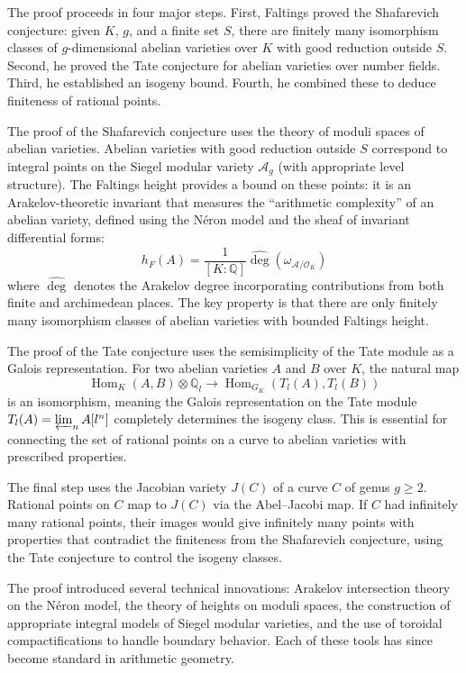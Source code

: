 The proof proceeds in four major steps. First, Faltings proved the Shafarevich conjecture: given $K$, $g$, and a finite set $S$, there are finitely many isomorphism classes of $g$-dimensional abelian varieties over $K$ with good reduction outside $S$. Second, he proved the Tate conjecture for abelian varieties over number fields. Third, he established an isogeny bound. Fourth, he combined these to deduce finiteness of rational points.

The proof of the Shafarevich conjecture uses the theory of moduli spaces of abelian varieties. Abelian varieties with good reduction outside $S$ correspond to integral points on the Siegel modular variety $\mathcal{A}_{g}$ (with appropriate level structure). The Faltings height provides a bound on these points: it is an Arakelov-theoretic invariant that measures the ``arithmetic complexity'' of an abelian variety, defined using the N\'eron model and the sheaf of invariant differential forms:
\[
h_F(A) = \frac{1}{[K:\mathbb{Q}]} \widehat{\deg}(\omega_{\mathcal{A}/\mathcal{O}_K})
\]
where $\widehat{\deg}$ denotes the Arakelov degree incorporating contributions from both finite and archimedean places. The key property is that there are only finitely many isomorphism classes of abelian varieties with bounded Faltings height.

The proof of the Tate conjecture uses the semisimplicity of the Tate module as a Galois representation. For two abelian varieties $A$ and $B$ over $K$, the natural map
\[
\operatorname{Hom}_K(A, B) \otimes \mathbb{Q}_l \to \operatorname{Hom}_{G_K}(T_l(A), T_l(B))
\]
is an isomorphism, meaning the Galois representation on the Tate module $T_l(A) = \varprojlim_n A[l^n]$ completely determines the isogeny class. This is essential for connecting the set of rational points on a curve to abelian varieties with prescribed properties.

The final step uses the Jacobian variety $J(C)$ of a curve $C$ of genus $g \geq 2$. Rational points on $C$ map to $J(C)$ via the Abel--Jacobi map. If $C$ had infinitely many rational points, their images would give infinitely many points with properties that contradict the finiteness from the Shafarevich conjecture, using the Tate conjecture to control the isogeny classes.

The proof introduced several technical innovations: Arakelov intersection theory on the N\'eron model, the theory of heights on moduli spaces, the construction of appropriate integral models of Siegel modular varieties, and the use of toroidal compactifications to handle boundary behavior. Each of these tools has since become standard in arithmetic geometry.

